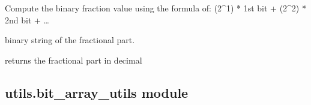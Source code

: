 \documentclass[letterpaper,10pt,english]{sphinxmanual}
\begin{document}
\begin{fulllineitems}
\label{\detokenize{utils:utils.ac_utils.getBinaryFractionValue}}
\pysigstartsignatures
{}
\pysigstopsignatures
\sphinxAtStartPar
Compute the binary fraction value using the formula of:
(2\textasciicircum{}\sphinxhyphen{}1) * 1st bit + (2\textasciicircum{}\sphinxhyphen{}2) * 2nd bit + …
\begin{description}
\begin{description}
\sphinxAtStartPar
binary string of the fractional part.

\end{description}

\begin{description}
\sphinxAtStartPar
returns the fractional part in decimal

\end{description}

\end{description}

\end{fulllineitems}



\subsection{utils.bit\_array\_utils module}
\label{\detokenize{utils:module-utils.bit_array_utils}}\label{\detokenize{utils:utils-bit-array-utils-module}}
\end{document}
